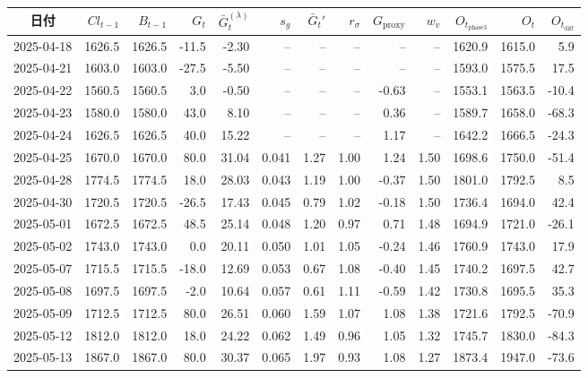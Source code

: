 \begin{tabularx}{\textwidth}{@{}c
  r r r r r r r r r r r r@{}}
\toprule
日付 & $Cl_{t-1}$ & $B_{t-1}$ & $G_t$ & $\bar G_t^{(\lambda)}$ & $s_g$ &
$\bar G_t'$ & $r_\sigma$ & $G_{\text{proxy}}$ & $w_v$ &
$O_{t_\text{phase3}}$ & $O_t$ & $O_{t_\text{diff}}$\\
\midrule
2025-04-18 & 1626.5 & 1626.5 & -11.5 & -2.30 & --   & --    & --   & --    & --  & 1620.9 & 1615.0 &  \phantom{-}5.9\\
2025-04-21 & 1603.0 & 1603.0 & -27.5 & -5.50 & --   & --    & --   & --    & --  & 1593.0 & 1575.5 &  17.5\\
2025-04-22 & 1560.5 & 1560.5 &   3.0 & -0.50 & --   & --    & --   & -0.63 & --  & 1553.1 & 1563.5 & -10.4\\
2025-04-23 & 1580.0 & 1580.0 &  43.0 &  8.10 & --   & --    & --   &  0.36 & --  & 1589.7 & 1658.0 & -68.3\\
2025-04-24 & 1626.5 & 1626.5 &  40.0 & 15.22 & --   & --    & --   &  1.17 & --  & 1642.2 & 1666.5 & -24.3\\
2025-04-25 & 1670.0 & 1670.0 &  80.0 & 31.04 & 0.041& 1.27  & 1.00 &  1.24 & 1.50& 1698.6 & 1750.0 & -51.4\\
2025-04-28 & 1774.5 & 1774.5 &  18.0 & 28.03 & 0.043& 1.19  & 1.00 & -0.37 & 1.50& 1801.0 & 1792.5 &   8.5\\
2025-04-30 & 1720.5 & 1720.5 & -26.5 & 17.43 & 0.045& 0.79  & 1.02 & -0.18 & 1.50& 1736.4 & 1694.0 &  42.4\\
2025-05-01 & 1672.5 & 1672.5 &  48.5 & 25.14 & 0.048& 1.20  & 0.97 &  0.71 & 1.48& 1694.9 & 1721.0 & -26.1\\
2025-05-02 & 1743.0 & 1743.0 &   0.0 & 20.11 & 0.050& 1.01  & 1.05 & -0.24 & 1.46& 1760.9 & 1743.0 &  17.9\\
2025-05-07 & 1715.5 & 1715.5 & -18.0 & 12.69 & 0.053& 0.67  & 1.08 & -0.40 & 1.45& 1740.2 & 1697.5 &  42.7\\
2025-05-08 & 1697.5 & 1697.5 &  -2.0 & 10.64 & 0.057& 0.61  & 1.11 & -0.59 & 1.42& 1730.8 & 1695.5 &  35.3\\
2025-05-09 & 1712.5 & 1712.5 &  80.0 & 26.51 & 0.060& 1.59  & 1.07 &  1.08 & 1.38& 1721.6 & 1792.5 & -70.9\\
2025-05-12 & 1812.0 & 1812.0 &  18.0 & 24.22 & 0.062& 1.49  & 0.96 &  1.05 & 1.32& 1745.7 & 1830.0 & -84.3\\
2025-05-13 & 1867.0 & 1867.0 &  80.0 & 30.37 & 0.065& 1.97  & 0.93 &  1.08 & 1.27& 1873.4 & 1947.0 & -73.6\\

\end{tabularx}
